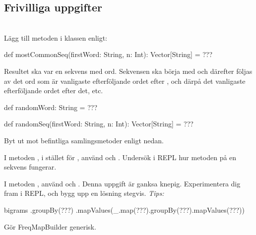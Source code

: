 \subsection{Frivilliga uppgifter} 

\Task {}\\ Lägg till metoden  i klassen  enligt: 
\begin{Code}
def mostCommonSeq(firstWord: String, n: Int): Vector[String] = ???
\end{Code}
Resultet ska var en sekvens med  ord. Sekvensen ska börja med  och därefter följas av det ord som är vanligaste efterföljande ordet efter , och därpå det vanligaste efterföljande ordet efter det, etc.

\Task
\begin{Code}
def randomWord: String = ???
\end{Code}

\Task
\begin{Code}
def randomSeq(firstWord: String, n: Int): Vector[String] = ???
\end{Code}

\Task Byt ut  mot befintliga samlingsmetoder enligt nedan.

\Subtask I metoden , i stället för , använd  och . Undersök i REPL hur metoden  på en sekvens fungerar.

\Subtask I metoden , använd  och . Denna uppgift är ganksa knepig. Experimentera dig fram i REPL, och bygg upp en lösning stegvis. \emph{Tips:}
\begin{Code}
bigrams
  .groupBy(???)
  .mapValues(_.map(???).groupBy(???).mapValues(???))
\end{Code}





\Task Gör FreqMapBuilder generisk.












